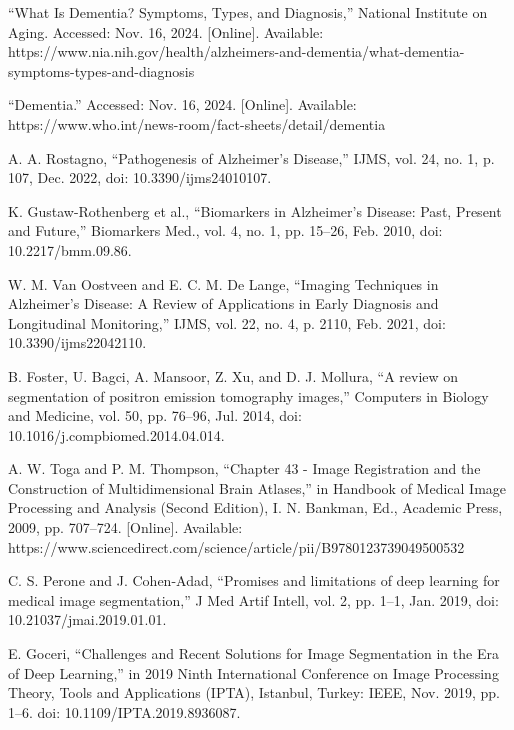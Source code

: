 
\begin{thebibliography}{00}
	 “What Is Dementia? Symptoms, Types, and Diagnosis,” National Institute on Aging. Accessed: Nov. 16, 2024. [Online]. Available: https://www.nia.nih.gov/health/alzheimers-and-dementia/what-dementia-symptoms-types-and-diagnosis
	
	 “Dementia.” Accessed: Nov. 16, 2024. [Online]. Available: https://www.who.int/news-room/fact-sheets/detail/dementia
	
	 A. A. Rostagno, “Pathogenesis of Alzheimer’s Disease,” IJMS, vol. 24, no. 1, p. 107, Dec. 2022, doi: 10.3390/ijms24010107.
	
	 K. Gustaw-Rothenberg et al., “Biomarkers in Alzheimer’s Disease: Past, Present and Future,” Biomarkers Med., vol. 4, no. 1, pp. 15–26, Feb. 2010, doi: 10.2217/bmm.09.86.
	
	 W. M. Van Oostveen and E. C. M. De Lange, “Imaging Techniques in Alzheimer’s Disease: A Review of Applications in Early Diagnosis and Longitudinal Monitoring,” IJMS, vol. 22, no. 4, p. 2110, Feb. 2021, doi: 10.3390/ijms22042110.
	
	 B. Foster, U. Bagci, A. Mansoor, Z. Xu, and D. J. Mollura, “A review on segmentation of positron emission tomography images,” Computers in Biology and Medicine, vol. 50, pp. 76–96, Jul. 2014, doi: 10.1016/j.compbiomed.2014.04.014.
	
	 A. W. Toga and P. M. Thompson, “Chapter 43 - Image Registration and the Construction of Multidimensional Brain Atlases,” in Handbook of Medical Image Processing and Analysis (Second Edition), I. N. Bankman, Ed., Academic Press, 2009, pp. 707–724. [Online]. Available: https://www.sciencedirect.com/science/article/pii/B9780123739049500532
	
	 C. S. Perone and J. Cohen-Adad, “Promises and limitations of deep learning for medical image segmentation,” J Med Artif Intell, vol. 2, pp. 1–1, Jan. 2019, doi: 10.21037/jmai.2019.01.01.
	
	 E. Goceri, “Challenges and Recent Solutions for Image Segmentation in the Era of Deep Learning,” in 2019 Ninth International Conference on Image Processing Theory, Tools and Applications (IPTA), Istanbul, Turkey: IEEE, Nov. 2019, pp. 1–6. doi: 10.1109/IPTA.2019.8936087.
	

\end{thebibliography}
